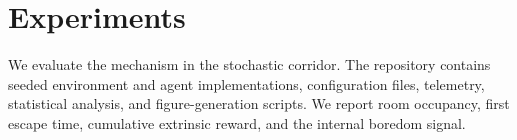\section{Experiments}
We evaluate the mechanism in the stochastic corridor. The repository contains
seeded environment and agent implementations, configuration files, telemetry,
statistical analysis, and figure-generation scripts. We report room occupancy,
first escape time, cumulative extrinsic reward, and the internal boredom signal.
